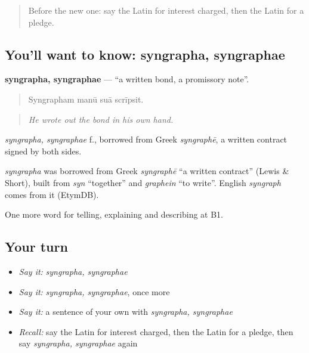 \begin{quote}
Before the new one: say the Latin for interest charged, then the Latin for a pledge.
\end{quote}

\subsection*{You'll want to know: syngrapha, syngraphae}
\textbf{syngrapha, syngraphae} — \textquotedblleft{}a written bond, a promissory note\textquotedblright{}.

\begin{quote}
Syngrapham manū suā scrīpsit.
\end{quote}

\begin{quote}
\emph{He wrote out the bond in his own hand.}
\end{quote}

\emph{syngrapha, syngraphae} f., borrowed from Greek \emph{syngraphē}, a written contract signed by both sides.

\begin{cousinweb}
\emph{syngrapha} was borrowed from Greek \emph{syngraphē} \textquotedblleft{}a written contract\textquotedblright{} (Lewis \& Short), built from \emph{syn} \textquotedblleft{}together\textquotedblright{} and \emph{graphein} \textquotedblleft{}to write\textquotedblright{}. English \emph{syngraph} comes from it (EtymDB).
\end{cousinweb}

\begin{grammarlens}[title={What you've built}]
One more word for telling, explaining and describing at B1.
\end{grammarlens}

\subsection*{Your turn}
\begin{itemize}
\raggedright
  \item \emph{Say it:} \emph{syngrapha, syngraphae}
  \item \emph{Say it:} \emph{syngrapha, syngraphae}, once more
  \item \emph{Say it:} a sentence of your own with \emph{syngrapha, syngraphae}
  \item \emph{Recall:} say the Latin for interest charged, then the Latin for a pledge, then say \emph{syngrapha, syngraphae} again
\end{itemize}

